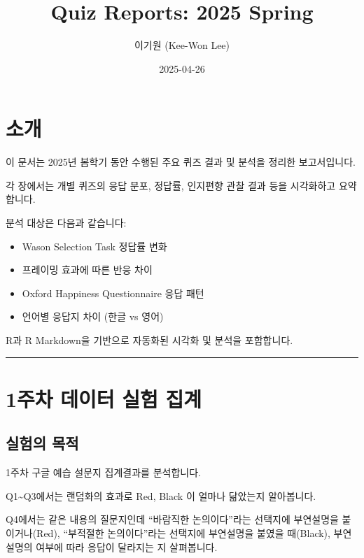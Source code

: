 \documentclass[
]{book}
\title{Quiz Reports: 2025 Spring}
\author{이기원 (Kee-Won Lee)}
\date{2025-04-26}
\providecommand{\tightlist}{%
  \setlength{\itemsep}{0pt}\setlength{\parskip}{0pt}}
\begin{document}
\maketitle

{
\setcounter{tocdepth}{1}
\tableofcontents
}
\chapter*{소개}\label{uxc18cuxac1c}

이 문서는 2025년 봄학기 동안 수행된 주요 퀴즈 결과 및 분석을 정리한 보고서입니다.

각 장에서는 개별 퀴즈의 응답 분포, 정답률, 인지편향 관찰 결과 등을 시각화하고 요약합니다.

분석 대상은 다음과 같습니다:

\begin{itemize}
\tightlist
\item
  Wason Selection Task 정답률 변화
\item
  프레이밍 효과에 따른 반응 차이
\item
  Oxford Happiness Questionnaire 응답 패턴
\item
  언어별 응답지 차이 (한글 vs 영어)
\end{itemize}

R과 R Markdown을 기반으로 자동화된 시각화 및 분석을 포함합니다.

\begin{center}\rule{0.5\linewidth}{0.5pt}\end{center}

\chapter{1주차 데이터 실험 집계}\label{uxc8fcuxcc28-uxb370uxc774uxd130-uxc2e4uxd5d8-uxc9d1uxacc4}

\section{실험의 목적}\label{uxc2e4uxd5d8uxc758-uxbaa9uxc801}

1주차 구글 예습 설문지 집계결과를 분석합니다.

Q1\textasciitilde Q3에서는 랜덤화의 효과로 Red, Black 이 얼마나 닮았는지 알아봅니다.

Q4에서는 같은 내용의 질문지인데 ``바람직한 논의이다''라는 선택지에 부연설명을 붙이거나(Red), ``부적절한 논의이다''라는 선택지에 부연설명을 붙였을 때(Black), 부연설명의 여부에 따라 응답이 달라지는 지 살펴봅니다.
\end{document}
